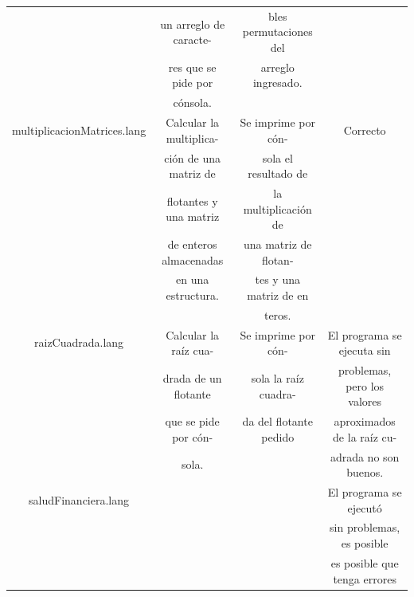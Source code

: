 \documentclass[11pt, spanish]{report}
\begin{document}
\begin{itemize}
\begin{table}[!hbp]
\begin{tabular}{c c c c}
                                  & un arreglo de caracte- & bles permutaciones del&                             \\ [1ex] 
                                  & res que se pide por    & arreglo ingresado.    &                             \\ [1ex] 
                                  & c\'onsola.             &                       &                             \\ [1ex] 
      multiplicacionMatrices.lang & Calcular la multiplica-& Se imprime por c\'on- & Correcto                    \\ [1ex]
                                  & ci\'on de una matriz de& sola el resultado de  &                             \\ [1ex] 
                                  & flotantes y una matriz & la multiplicaci\'on de&                             \\ [1ex] 
                                  & de enteros almacenadas & una matriz de flotan- &                             \\ [1ex] 
                                  & en una estructura.     & tes y una matriz de en&                             \\ [1ex] 
                                  &                        & teros.                &                             \\ [1ex] 
      raizCuadrada.lang           & Calcular la ra\'iz cua-& Se imprime por c\'on- & El programa se ejecuta sin  \\ [1ex] 
                                  & drada de un flotante   & sola la ra\'iz cuadra-& problemas, pero los valores \\ [1ex]
                                  & que se pide por c\'on- & da del flotante pedido& aproximados de la ra\'iz cu-\\ [1ex] 
                                  & sola.                  &                       & adrada no son buenos.       \\ [1ex]  
      saludFinanciera.lang        &                        &                       & El programa se ejecut\'o    \\ [1ex]  
                                  &                        &                       & sin problemas, es posible   \\ [1ex] 
                                  &                        &                       & es posible que tenga errores\\ [1ex] 

\end{tabular}
\end{table}
\end{itemize}
\end{document}
